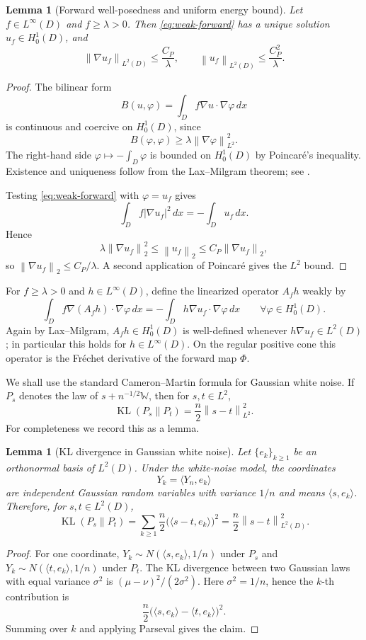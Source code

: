 \documentclass[12pt]{article}
\newtheorem{lemma}[theorem]{Lemma}
\theoremstyle{remark}
\DeclareMathOperator{\KL}{KL}
\newcommand{\norm}[1]{\left\lVert #1\right\rVert}
\begin{document}
\begin{lemma}[Forward well-posedness and uniform energy bound]
\label{lem:forward-energy}
Let \(f\in L^\infty(D)\) and \(f\ge \lambda>0\). Then \eqref{eq:weak-forward} has a unique solution \(u_f\in H^1_0(D)\), and
\[
\norm{\nabla u_f}_{L^2(D)}\le \frac{C_P}{\lambda},
\qquad
\norm{u_f}_{L^2(D)}\le \frac{C_P^2}{\lambda}.
\]
\end{lemma}
\begin{proof}
The bilinear form
\[
B(u,\varphi)=\int_D f\nabla u\cdot\nabla\varphi\,dx
\]
is continuous and coercive on \(H^1_0(D)\), since
\[
B(\varphi,\varphi)\ge \lambda\norm{\nabla\varphi}_{L^2}^2.
\]
The right-hand side \(\varphi\mapsto -\int_D\varphi\) is bounded on \(H^1_0(D)\) by Poincar\'e's inequality. Existence and uniqueness follow from the Lax--Milgram theorem; see \cite{Evans}.

Testing \eqref{eq:weak-forward} with \(\varphi=u_f\) gives
\[
\int_D f|\nabla u_f|^2\,dx
=
-\int_D u_f\,dx.
\]
Hence
\[
\lambda\norm{\nabla u_f}_2^2
\le
\norm{u_f}_2
\le
C_P\norm{\nabla u_f}_2,
\]
so \(\norm{\nabla u_f}_2\le C_P/\lambda\). A second application of Poincar\'e gives the \(L^2\) bound.
\end{proof}

For \(f\ge\lambda>0\) and \(h\in L^\infty(D)\), define the linearized operator \(A_f h\) weakly by
\begin{equation}
\label{eq:Af-def}
\int_D f\nabla(A_f h)\cdot\nabla\varphi\,dx
=
-\int_D h\nabla u_f\cdot\nabla\varphi\,dx
\qquad \forall\varphi\in H^1_0(D).
\end{equation}
Again by Lax--Milgram, \(A_f h\in H^1_0(D)\) is well-defined whenever \(h\nabla u_f\in L^2(D)\); in particular this holds for \(h\in L^\infty(D)\). On the regular positive cone this operator is the Fr\'echet derivative of the forward map \(\Phi\).

We shall use the standard Cameron--Martin formula for Gaussian white noise. If \(P_s\) denotes the law of \(s+n^{-1/2}\mathbb W\), then for \(s,t\in L^2\),
\[
\KL(P_s\|P_t)=\frac n2\norm{s-t}_{L^2}^2.
\]
For completeness we record this as a lemma.

\begin{lemma}[KL divergence in Gaussian white noise]
\label{lem:white-kl}
Let \(\{e_k\}_{k\ge1}\) be an orthonormal basis of \(L^2(D)\). Under the white-noise model, the coordinates
\[
Y_k=\langle Y_n,e_k\rangle
\]
are independent Gaussian random variables with variance \(1/n\) and means \(\langle s,e_k\rangle\). Therefore, for \(s,t\in L^2(D)\),
\[
\KL(P_s\|P_t)
=
\sum_{k\ge1}\frac{n}{2}\bigl(\langle s-t,e_k\rangle\bigr)^2
=
\frac n2\norm{s-t}_{L^2(D)}^2.
\]
\end{lemma}
\begin{proof}
For one coordinate, \(Y_k\sim N(\langle s,e_k\rangle,1/n)\) under \(P_s\) and \(Y_k\sim N(\langle t,e_k\rangle,1/n)\) under \(P_t\). The KL divergence between two Gaussian laws with equal variance \(\sigma^2\) is \((\mu-\nu)^2/(2\sigma^2)\). Here \(\sigma^2=1/n\), hence the \(k\)-th contribution is
\[
\frac n2\bigl(\langle s,e_k\rangle-\langle t,e_k\rangle\bigr)^2.
\]
Summing over \(k\) and applying Parseval gives the claim.
\end{proof}
\end{document}
